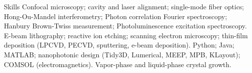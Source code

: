 \begin{rubric}{Skills}
    Confocal microscopy; cavity and laser alignment; single-mode fiber optics; Hong-Ou-Mandel interferometry; Photon correlation Fourier spectroscopy; Hanbury Brown-Twiss measurement; Photoluminescence excitation spectroscopy.
    E-beam lithography; reactive ion etching; scanning electron microscopy; thin-film deposition (LPCVD, PECVD, sputtering, e-beam deposition).
    Python; Java; MATLAB; nanophotonic design (Tidy3D, Lumerical, MEEP, MPB, KLayout); COMSOL (electromagnetics).
    Vapor-phase and liquid-phase crystal growth.
\end{rubric}





